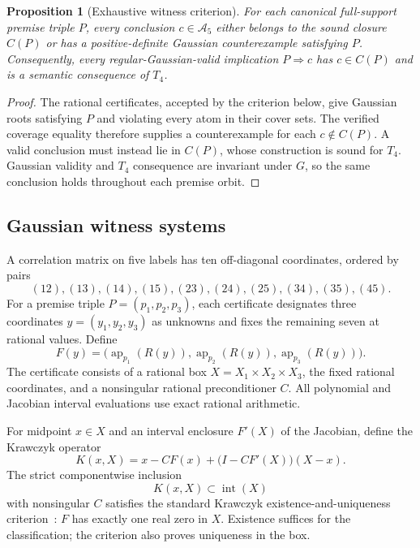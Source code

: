 \documentclass[10pt]{article}
\newtheorem{proposition}[theorem]{Proposition}
\theoremstyle{definition}
\newcommand{\A}{\mathcal A}
\newcommand{\Tfour}{T_4}
\newcommand{\AP}{\operatorname{ap}}
\begin{document}
\begin{proposition}[Exhaustive witness criterion]\label{prop:coverage}
For each canonical full-support premise triple $P$, every conclusion $c\in\A_5$ either belongs to the sound closure $C(P)$ or has a positive-definite Gaussian counterexample satisfying $P$.  Consequently, every regular-Gaussian-valid implication $P\Rightarrow c$ has $c\in C(P)$ and is a semantic consequence of $\Tfour$.
\end{proposition}

\begin{proof}
The rational certificates, accepted by the criterion below, give Gaussian roots satisfying $P$ and violating every atom in their cover sets.  The verified coverage equality therefore supplies a counterexample for each $c\notin C(P)$.  A valid conclusion must instead lie in $C(P)$, whose construction is sound for $\Tfour$.  Gaussian validity and $\Tfour$ consequence are invariant under $G$, so the same conclusion holds throughout each premise orbit.
\end{proof}

\subsection{Gaussian witness systems}

A correlation matrix on five labels has ten off-diagonal coordinates, ordered by pairs
\[
 (12),(13),(14),(15),(23),(24),(25),(34),(35),(45).
\]
For a premise triple $P=(p_1,p_2,p_3)$, each certificate designates three coordinates $y=(y_1,y_2,y_3)$ as unknowns and fixes the remaining seven at rational values.  Define
\[
 F(y)=\bigl(\AP_{p_1}(R(y)),\AP_{p_2}(R(y)),\AP_{p_3}(R(y))\bigr).
\]
The certificate consists of a rational box $X=X_1\times X_2\times X_3$, the fixed rational coordinates, and a nonsingular rational preconditioner $C$.  All polynomial and Jacobian interval evaluations use exact rational arithmetic.

For midpoint $x\in X$ and an interval enclosure $F'(X)$ of the Jacobian, define the Krawczyk operator~\cite{Krawczyk1969,Rump2010}
\begin{equation}\label{eq:krawczyk}
 K(x,X)=x-CF(x)+\bigl(I-CF'(X)\bigr)(X-x).
\end{equation}
The strict componentwise inclusion
\begin{equation}\label{eq:strictK}
 K(x,X)\subset\operatorname{int}(X)
\end{equation}
with nonsingular $C$ satisfies the standard Krawczyk existence-and-uniqueness criterion~\cite{Krawczyk1969,Rump2010}: $F$ has exactly one real zero in $X$.  Existence suffices for the classification; the criterion also proves uniqueness in the box.
\end{document}
